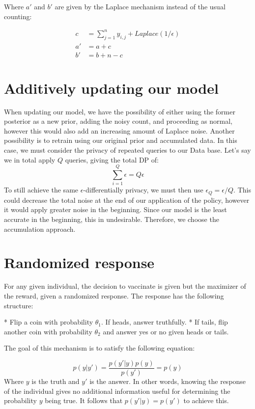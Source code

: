 \documentclass{article}
\begin{document}
Where $a'$ and $b'$ are given by the Laplace mechanism instead of the usual counting:

\begin{equation}
    \begin{split}
        c &= \sum_{j=1}^{n} y_{i,j} + Laplace(1/\epsilon)\\
        a' &= a + c\\
        b' &= b + n - c
    \end{split}
\end{equation}


\section{Additively updating our model}
When updating our model, we have the possibility of either using the former posterior as a new prior, adding the noisy count, and proceeding as normal, however this would also add an increasing amount of Laplace noise. Another possibility is to retrain using our original prior and accumulated data. In this case, we must consider the privacy of repeated queries to our Data base. Let's say we in total apply $Q$ queries, giving the total DP of:
$$
    \sum_{i=1}^{Q} \epsilon = Q\epsilon
$$
To still achieve the same $\epsilon$-differentially privacy, we must then use $\epsilon_Q = \epsilon/Q$. This could decrease the total noise at the end of our application of the policy, however it would apply greater noise in the beginning. Since our model is the least accurate in the beginning, this in undesirable. Therefore, we choose the accumulation approach.

\section{Randomized response}
For any given individual, the decision to vaccinate is given but the maximizer of the reward, given a randomized response.
The response has the following structure:

* Flip a coin with probability $\theta_1$. If heads, answer truthfully.
* If tails, flip another coin with probability $\theta_2$ and answer yes or no given heads or tails. 

The goal of this mechanism is to satisfy the following equation:

$$
p(y|y') = \frac{p(y'|y)p(y)}{p(y')} = p(y)
$$
Where $y$ is the truth and $y'$ is the answer. In other words, knowing the response of the individual gives no additional information useful for determining the probability $y$ being true. It follows that $p(y'|y) = p(y')$ to achieve this.
\end{document}
